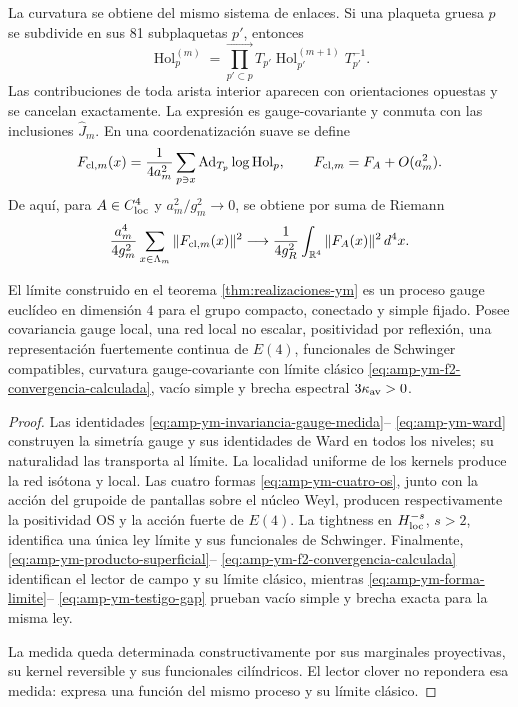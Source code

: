 La curvatura se obtiene del mismo sistema de enlaces.  Si una plaqueta
gruesa \(p\) se subdivide en sus 81 subplaquetas \(p'\), entonces
\begin{equation}\label{eq:amp-ym-producto-superficial}
 \operatorname{Hol}^{(m)}_{p}
 =\prod_{p'\subset p}^{\longrightarrow}
 T_{p'}\operatorname{Hol}^{(m+1)}_{p'}T_{p'}^{-1}.
\end{equation}
Las contribuciones de toda arista interior aparecen con orientaciones
opuestas y se cancelan exactamente.  La expresión es gauge-covariante y
conmuta con las inclusiones \(\widehat J_m\).  En una coordenatización suave se define
\begin{equation}\label{eq:amp-ym-clover-definido}
 F_{{\rm cl},m}(x)
 =\frac1{4a_m^2}\sum_{p\ni x}
 \operatorname{Ad}_{T_p}\log\operatorname{Hol}_{p},
 \qquad
 F_{{\rm cl},m}=F_A+O(a_m^2).
\end{equation}
De aquí, para \(A\in C^4_{\rm loc}\) y
\(a_m^2/g_m^2\to0\), se obtiene por suma de Riemann
\begin{equation}\label{eq:amp-ym-f2-convergencia-calculada}
 \frac{a_m^4}{4g_m^2}
 \sum_{x\in\Lambda_m}\|F_{{\rm cl},m}(x)\|^2
 \longrightarrow
 \frac1{4g_R^2}\int_{\mathbb R^4}\|F_A(x)\|^2\,d^4x.
\end{equation}

\begin{theorem}
\label{thm:amp-ym-identificacion-gauge}
El límite construido en el teorema
\ref{thm:realizaciones-ym} es un proceso gauge euclídeo en dimensión
\(4\) para el grupo compacto, conectado y simple fijado. Posee
covariancia gauge local, una red local no escalar, positividad por
reflexión, una representación fuertemente continua de \(E(4)\),
funcionales de Schwinger compatibles, curvatura gauge-covariante con límite
clásico \eqref{eq:amp-ym-f2-convergencia-calculada}, vacío simple y brecha
espectral
\(3\kappa_{\rm av}>0\).
\end{theorem}

\begin{proof}
Las identidades \eqref{eq:amp-ym-invariancia-gauge-medida}--
\eqref{eq:amp-ym-ward} construyen la simetría gauge y sus identidades de
Ward en todos los niveles; su naturalidad las transporta al límite.  La
localidad uniforme de los kernels produce la red isótona y local.  Las
cuatro formas \eqref{eq:amp-ym-cuatro-os}, junto con la acción del grupoide
de pantallas sobre el núcleo Weyl, producen respectivamente la positividad
OS y la acción fuerte de \(E(4)\).  La tightness en
\(H^{-s}_{\rm loc}\), \(s>2\), identifica una única ley límite y sus
funcionales de Schwinger.  Finalmente,
\eqref{eq:amp-ym-producto-superficial}--
\eqref{eq:amp-ym-f2-convergencia-calculada} identifican el lector de campo
y su límite clásico, mientras
\eqref{eq:amp-ym-forma-limite}--
\eqref{eq:amp-ym-testigo-gap} prueban vacío simple y brecha exacta para la
misma ley.

La medida queda determinada constructivamente por sus marginales
proyectivas, su kernel reversible y sus funcionales cilíndricos. El lector
clover no repondera esa medida: expresa una función del mismo proceso y su
límite clásico.
\end{proof}

